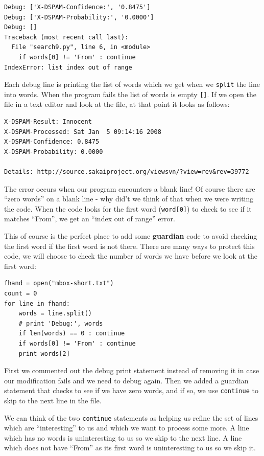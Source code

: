 \documentclass[10pt]{book}
\begin{document}
\beforeverb
\begin{verbatim}
Debug: ['X-DSPAM-Confidence:', '0.8475']
Debug: ['X-DSPAM-Probability:', '0.0000']
Debug: []
Traceback (most recent call last):
  File "search9.py", line 6, in <module>
    if words[0] != 'From' : continue
IndexError: list index out of range
\end{verbatim}
\afterverb
%
Each debug line is printing the list of words which we get
when we {\tt split} the line into words.  When the program fails
the list of words is empty \verb"[]".  If we open the file in a text editor
and look at the file, at that point it looks as follows:

\beforeverb
\begin{verbatim}
X-DSPAM-Result: Innocent
X-DSPAM-Processed: Sat Jan  5 09:14:16 2008
X-DSPAM-Confidence: 0.8475
X-DSPAM-Probability: 0.0000

Details: http://source.sakaiproject.org/viewsvn/?view=rev&rev=39772
\end{verbatim}
\afterverb
%
The error occurs when our program encounters a blank line! Of course there
are ``zero words'' on a blank line - why did't we think of that 
when we were writing the code.  When the code looks for the first
word (\verb"word[0]") to check to see if it matches ``From'', 
we get an ``index out of range'' error.

This of course is the perfect place to add some {\bf guardian} code 
to avoid checking the first word if the first word is not there.
There are many ways to protect this code, we will choose to 
check the number of words we have before we look at the first word:

\beforeverb
\begin{verbatim}
fhand = open("mbox-short.txt")
count = 0
for line in fhand:
    words = line.split()
    # print 'Debug:', words
    if len(words) == 0 : continue
    if words[0] != 'From' : continue
    print words[2]
\end{verbatim}
\afterverb
%
First we commented out the debug print statement instead of removing it 
in case our modification fails and we need to debug again.  Then we added
a guardian statement that checks to see if we have zero words, and if so, 
we use {\tt continue} to skip to the next line in the file.

We can think of the two {\tt continue} statements as helping us refine
the set of lines which are ``interesting'' to us and which we want 
to process some more.  A line which has no words is uninteresting to 
us so we skip to the next line.  A line which does not have ``From''
as its first word is uninteresting to us so we skip it.
\end{document}
